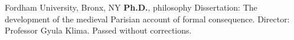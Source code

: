 {%
	Fordham University, Bronx, NY}
{%
	\textbf{Ph.D.}, philosophy}
{%
	Dissertation: The development of the medieval Parisian account of formal consequence. Director: Professor Gyula Klima. Passed without corrections.}
